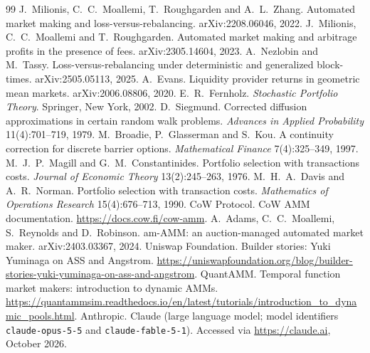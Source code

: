 \balance
\begin{thebibliography}{99}\fontsize{8}{9.4}\selectfont\def\UrlFont{\fontsize{7.5}{9.4}\selectfont}\setlength{\itemsep}{0pt}\setlength{\parsep}{0pt}
 J.~Milionis, C.~C.~Moallemi, T.~Roughgarden and A.~L.~Zhang. Automated market making and loss-versus-rebalancing. arXiv:2208.06046, 2022.
 J.~Milionis, C.~C.~Moallemi and T.~Roughgarden. Automated market making and arbitrage profits in the presence of fees. arXiv:2305.14604, 2023.
 A.~Nezlobin and M.~Tassy. Loss-versus-rebalancing under deterministic and generalized block-times. arXiv:2505.05113, 2025.
 A.~Evans. Liquidity provider returns in geometric mean markets. arXiv:2006.08806, 2020.
 E.~R.~Fernholz. \emph{Stochastic Portfolio Theory}. Springer, New York, 2002.
 D.~Siegmund. Corrected diffusion approximations in certain random walk problems. \emph{Advances in Applied Probability} 11(4):701--719, 1979.
 M.~Broadie, P.~Glasserman and S.~Kou. A continuity correction for discrete barrier options. \emph{Mathematical Finance} 7(4):325--349, 1997.
 M.~J.~P.~Magill and G.~M.~Constantinides. Portfolio selection with transactions costs. \emph{Journal of Economic Theory} 13(2):245--263, 1976.
 M.~H.~A.~Davis and A.~R.~Norman. Portfolio selection with transaction costs. \emph{Mathematics of Operations Research} 15(4):676--713, 1990.
 CoW Protocol. CoW AMM documentation. \url{https://docs.cow.fi/cow-amm}.
 A.~Adams, C.~C.~Moallemi, S.~Reynolds and D.~Robinson. am-AMM: an auction-managed automated market maker. arXiv:2403.03367, 2024.
 Uniswap Foundation. Builder stories: Yuki Yuminaga on ASS and Angstrom. \url{https://uniswapfoundation.org/blog/builder-stories-yuki-yuminaga-on-ass-and-angstrom}.
 QuantAMM. Temporal function market makers: introduction to dynamic AMMs. \url{https://quantammsim.readthedocs.io/en/latest/tutorials/introduction_to_dynamic_pools.html}.
 Anthropic. Claude (large language model; model identifiers \texttt{claude-opus-5-5} and \texttt{claude-fable-5-1}). Accessed via \url{https://claude.ai}, October 2026.
\end{thebibliography}

